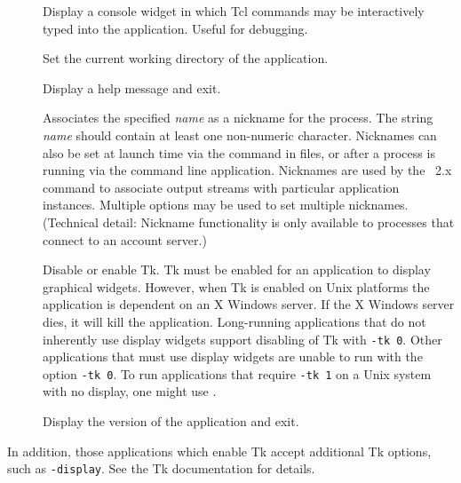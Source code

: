 \begin{description}
\item[]
Display a console widget in which Tcl
commands may be interactively typed into the application.
Useful for debugging.

\item[]
Set the current working directory of the application.

\item[]
Display a help message and exit.

\item[]
Associates the specified \textit{name} as a nickname for the process.
The string \textit{name} should contain at least one non-numeric
character.  Nicknames can also be set at launch time via the
 command in  files, or
after a process is running via the
command line application.  Nicknames are used by the \MIF\ 2.x
 command to associate  output streams with
particular application instances.  Multiple  options may
be used to set multiple nicknames.  (Technical detail: Nickname
functionality is only available to processes that connect to an
account server.)

\item[]
Disable or enable Tk.  Tk must be enabled for an application to display
graphical widgets.  However, when Tk is enabled on Unix platforms
the application is dependent on an X Windows server.  If the
X Windows server dies, it will kill the application.  Long-running
applications that do not inherently use display widgets support
disabling of Tk with \verb+-tk 0+.
Other applications that must use display widgets are unable to run
with the option \verb+-tk 0+.  To run applications that require
\verb+-tk 1+ on a Unix system with no display, one might use
.

\item[]
Display the version of the application and exit.
\end{description}

In addition, those applications which enable Tk accept additional Tk
options, such as \verb+-display+.  See the Tk documentation for details.

